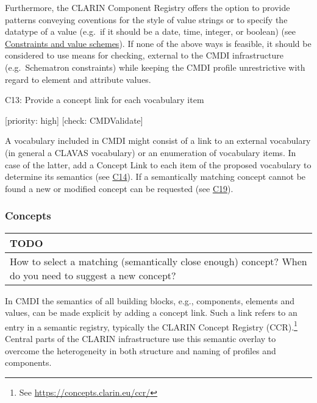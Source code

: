 Furthermore, the CLARIN Component Registry offers the option to provide
patterns conveying coventions for the style of value strings or to
specify the datatype of a value (e.g.~if it should be a date, time,
integer, or boolean) (see
\protect\hyperlink{constraints-and-value-schemes}{Constraints and value
schemes}). If none of the above ways is feasible, it should be
considered to use means for checking, external to the CMDI
infrastructure (e.g.~Schematron constraints) while keeping the CMDI
profile unrestrictive with regard to element and attribute values.

C13: Provide a concept link for each vocabulary item

{[}priority: high{]} {[}check: CMDValidate{]}

A vocabulary included in CMDI might consist of a link to an external
vocabulary (in general a CLAVAS vocabulary) or an enumeration of
vocabulary items. In case of the latter, add a Concept Link to each item
of the proposed vocabulary to determine its semantics (see
\protect\hyperlink{c14}{C14}). If a semantically matching concept cannot
be found a new or modified concept can be requested (see
\protect\hyperlink{c19}{C19}).

\hypertarget{concepts}{\subsubsection{Concepts}\label{concepts}}

\begin{longtable}[c]{@{}l@{}}
\toprule
\begin{minipage}[b]{0.05\columnwidth}\raggedright\strut
TODO
\strut\end{minipage}\tabularnewline
\midrule
\endhead
\begin{minipage}[t]{0.05\columnwidth}\raggedright\strut
How to select a matching (semantically close enough) concept? When do
you need to suggest a new concept?
\strut\end{minipage}\tabularnewline
\bottomrule
\end{longtable}

In CMDI the semantics of all building blocks, e.g., components, elements
and values, can be made explicit by adding a concept link. Such a link
refers to an entry in a semantic registry, typically the CLARIN Concept
Registry (CCR).\footnote{See \url{https://concepts.clarin.eu/ccr/}}
Central parts of the CLARIN infrastructure use this semantic overlay to
overcome the heterogeneity in both structure and naming of profiles and
components.

